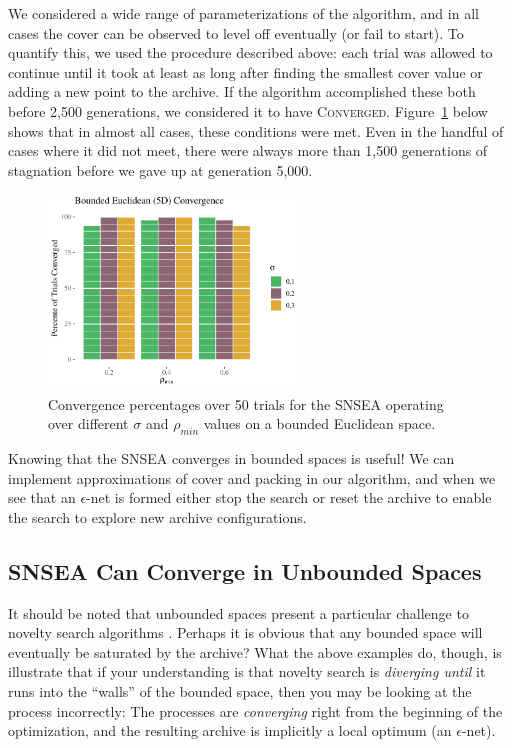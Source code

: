 \documentclass[twoside]{article}
\begin{document}
We considered a wide range of parameterizations of the algorithm, and in all cases the cover can be observed to level off eventually (or fail to start).  To quantify this, we used the procedure described above:  each trial was allowed to continue until it took at least as long after finding the smallest cover value or adding a new point to the archive.  If the algorithm accomplished these both before 2,500 generations, we considered it to have \textsc{Converged}.  Figure~\ref{fig:bounded:nopop:conv} below shows that in almost all cases, these conditions were met.  Even in the handful of cases where it did not meet, there were always more than 1,500 generations of stagnation before we gave up at generation 5,000.  
%
\begin{figure}[h]
  \center\includegraphics[width=0.6\textwidth]{Figures/bounded-conv-NOPOP.pdf}
  \caption{\label{fig:bounded:nopop:conv} Convergence percentages over 50 trials for the SNSEA operating over different $\sigma$ and $\rho_{min}$ values on a bounded Euclidean space.}
\end{figure}

Knowing that the SNSEA converges in bounded spaces is useful! We can implement approximations of cover and packing in our algorithm, and when we see that an $\epsilon$-net is formed either stop the search or reset the archive to enable the search to explore new archive configurations.  


\subsection{SNSEA Can Converge in Unbounded Spaces}
\label{subsec:unbounded}

It should be noted that unbounded spaces present a particular challenge to novelty search algorithms \citep{LehmanStanley2008ssls,Doncieux2019gecco}.  Perhaps it is obvious that any bounded space will eventually be saturated by the archive?  What the above examples do, though, is illustrate that if your understanding is that novelty search is \emph{diverging until} it runs into the ``walls'' of the bounded space, then you may be looking at the process incorrectly:  The processes are \emph{converging} right from the beginning of the optimization, and the resulting archive is implicitly a local optimum (an $\epsilon$-net).
\end{document}
